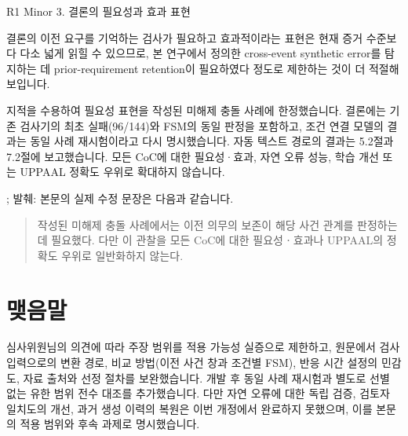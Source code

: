 \begin{reviewitem}{R1 Minor 3. 결론의 필요성과 효과 표현}

\begin{reviewercomment}

결론의 이전 요구를 기억하는 검사가 필요하고 효과적이라는 표현은 현재 증거 수준보다 다소 넓게 읽힐 수 있으므로, 본 연구에서 정의한 cross-event synthetic error를 탐지하는 데 prior-requirement retention이 필요하였다 정도로 제한하는 것이 더 적절해 보입니다.

\end{reviewercomment}

\begin{authorresponse}

지적을 수용하여 필요성 표현을 작성된 미해제 충돌 사례에 한정했습니다. 결론에는 기존 검사기의 최초 실패(96/144)와 FSM의 동일 판정을 포함하고, 조건 연결 모델의 결과는 동일 사례 재시험이라고 다시 명시했습니다. 자동 텍스트 경로의 결과는 5.2절과 7.2절에 보고했습니다. 모든 CoC에 대한 필요성·효과, 자연 오류 성능, 학습 개선 또는 UPPAAL 정확도 우위로 확대하지 않습니다.

\end{authorresponse}

\begin{manuscriptrevision}{; 발췌: }
본문의 실제 수정 문장은 다음과 같습니다.

\begin{quote}
작성된 미해제 충돌 사례에서는 이전 의무의 보존이 해당 사건 관계를 판정하는 데 필요했다. 다만 이 관찰을 모든 CoC에 대한 필요성ㆍ효과나 UPPAAL의 정확도 우위로 일반화하지 않는다.
\end{quote}
\end{manuscriptrevision}

\end{reviewitem}

\section*{맺음말}

심사위원님의 의견에 따라 주장 범위를 적용 가능성 실증으로 제한하고, 원문에서 검사 입력으로의 변환 경로, 비교 방법(이전 사건 창과 조건별 FSM), 반응 시간 설정의 민감도, 자료 출처와 선정 절차를 보완했습니다. 개발 후 동일 사례 재시험과 별도로 선별 없는 유한 범위 전수 대조를 추가했습니다. 다만 자연 오류에 대한 독립 검증, 검토자 일치도의 개선, 과거 생성 이력의 복원은 이번 개정에서 완료하지 못했으며, 이를 본문의 적용 범위와 후속 과제로 명시했습니다.


